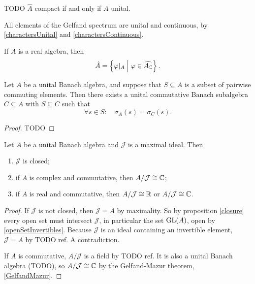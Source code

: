 TODO $\hat{A}$ compact if and only if $A$ unital.

All elements of the Gelfand spectrum are unital and continuous, by \ref{charactersUnital} and \ref{charactersContinuous}.

If $A$ is a real algebra, then
\[ \hat{A} = \left\{ \varphi|_A \;\middle|\; \varphi\in \widehat{A_{\mathbb{C}}} \right\}. \]

\begin{proposition} \label{commutativeSameSpectrum}
Let $A$ be  a  unital  Banach  algebra,  and  suppose  that $S\subseteq A$ is a subset  of  pairwise commuting elements.  Then there exists a unital commutative Banach subalgebra $C\subseteq A$ with $S\subseteq C$ such that
\[ \forall s\in S: \quad \sigma_A(s) = \sigma_C(s). \]
\end{proposition}
\begin{proof}
TODO
\end{proof}

\begin{proposition} \label{BanachAlgebraIdeals}
Let $A$ be a unital Banach algebra and $\mathcal{J}$ is a maximal ideal. Then 
\begin{enumerate}
\item $\mathcal{J}$ is closed;
\item if $A$ is complex and commutative, then $A/\mathcal{J} \cong \mathbb{C}$;
\item if $A$ is real and commutative, then $A/\mathcal{J} \cong \mathbb{R}$ or $A/\mathcal{J} \cong \mathbb{C}$.
\end{enumerate}
\end{proposition}
\begin{proof}
If $\mathcal{J}$ is not closed, then $\overline{\mathcal{J}} = A$ by maximality. So by proposition \ref{closure} every open set must intersect $\mathcal{J}$, in particular the set $\operatorname{GL}(A)$, open by \ref{openSetInvertibles}. Because $\mathcal{J}$ is an ideal containing an invertible element, $\mathcal{J}=A$ by TODO ref. A contradiction.

If $A$ is commutative, $A/\mathcal{J}$ is a field by TODO ref. It is also a unital Banach algebra (TODO), so $A/\mathcal{J} \cong \mathbb{C}$ by the Gelfand-Mazur theorem, \ref{GelfandMazur}.
\end{proof}

